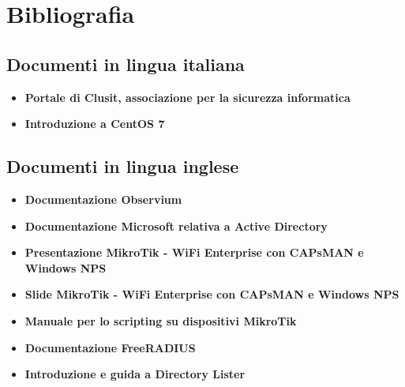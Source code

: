 \documentclass[Tesi.tex]{subfiles}
\begin{document}
\renewcommand{\leftmark}{Bibliografia}

\chapter*{Bibliografia}
\section*{Documenti in lingua italiana}
\begin{itemize}
	\item \textbf{Portale di Clusit, associazione per la sicurezza informatica}\\
	\item \textbf{Introduzione a CentOS 7}\\
\end{itemize}

\section*{Documenti in lingua inglese}
\begin{itemize}
	\item \textbf{Documentazione Observium}\\
	\item \textbf{Documentazione Microsoft relativa a Active Directory}\\
	\item \textbf{Presentazione MikroTik - WiFi Enterprise con CAPsMAN e Windows NPS}\\
	\item \textbf{Slide MikroTik - WiFi Enterprise con CAPsMAN e Windows NPS}\\
	\item \textbf{Manuale per lo scripting su dispositivi MikroTik}\\
	\item \textbf{Documentazione FreeRADIUS}\\
	\item \textbf{Introduzione e guida a Directory Lister}\\
	
\end{itemize}
\end{document}

